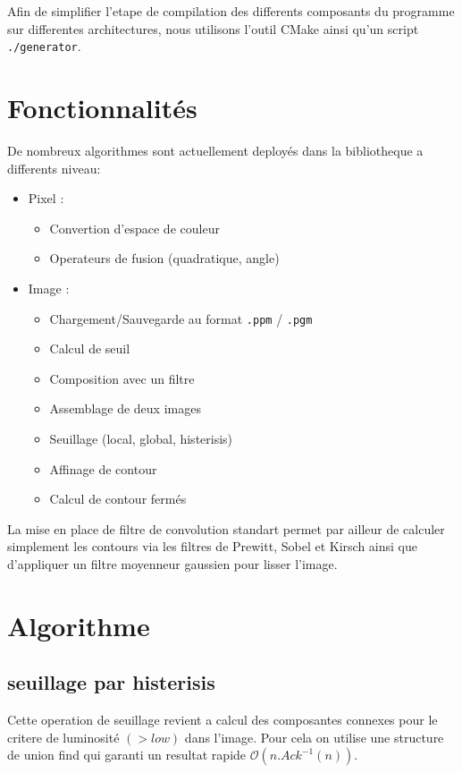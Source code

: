 Afin de simplifier l'etape de compilation des differents composants du programme sur differentes architectures, nous utilisons l'outil CMake ainsi qu'un script \texttt{./generator}.


\section*{Fonctionnalités}

De nombreux algorithmes sont actuellement deployés dans la bibliotheque a differents niveau:

\begin{itemize}
	\item Pixel :
		\begin{itemize}
			\item Convertion d'espace de couleur
			\item Operateurs de fusion (quadratique, angle)
		\end{itemize}
	\item Image :
		\begin{itemize}
			\item Chargement/Sauvegarde au format \texttt{.ppm} / \texttt{.pgm}
			\item Calcul de seuil
			\item Composition avec un filtre
			\item Assemblage de deux images
			\item Seuillage (local, global, histerisis)
			\item Affinage de contour
			\item Calcul de contour fermés
		\end{itemize}
\end{itemize}

La mise en place de filtre de convolution standart permet par ailleur de calculer simplement les contours via les filtres de Prewitt, Sobel et Kirsch ainsi que d'appliquer un filtre moyenneur gaussien pour lisser l'image.



\section*{Algorithme}
\subsection*{seuillage par histerisis}
Cette operation de seuillage revient a calcul des composantes connexes pour le critere de luminosité $(>low)$ dans l'image. Pour cela on utilise une structure de union find qui garanti un resultat rapide $\mathcal O(n.Ack^{-1}(n))$.

